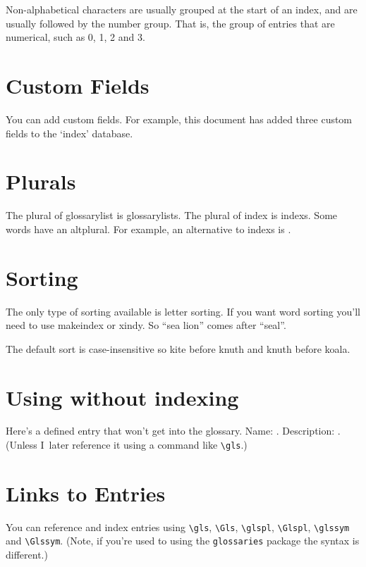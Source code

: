 \documentclass{book}
\newcommand*{\glsaltpl}[1]{\useentry{#1}{AltPlural}}
\begin{document}
Non-alphabetical characters are usually grouped at the start of an
index, and are usually followed by the number group. That is, the
group of entries that are numerical, such as \gls{0}, \gls{1},
\gls{2} and \gls{3}.

\section{Custom Fields}

You can add custom fields. For example, this document has added
three custom fields to the `index' database.

\section{Plurals}

The \gls{plural} of \gls{glossarylist} is
\glspl{glossarylist}. The \gls{plural} of \gls{index} is
\glspl{index}. Some words have an \gls{altplural}. For example,
an alternative to \glspl{index} is 
\glsaltpl{ind-index}.%

\section{Sorting}

The only type of sorting available is letter sorting. If you want
word sorting you'll need to use \gls{makeindex} or \gls{xindy}.
So ``\gls{sea lion}'' comes after ``\gls{seal}''.

The default sort is case-insensitive so \gls{kite} before
\gls{knuth} and \gls{knuth} before \gls{koala}.

\section{Using without indexing}

Here's a defined entry that won't get into the glossary.
Name: .
Description: .
(Unless I~later reference it using a command like \verb|\gls|.)

\section{Links to Entries}

You can reference and index entries using \verb|\gls|, \verb|\Gls|,
\verb|\glspl|, \verb|\Glspl|, \verb|\glssym| and \verb|\Glssym|.
(Note, if you're used to using the \texttt{glossaries} package
the syntax is different.)
\end{document}
